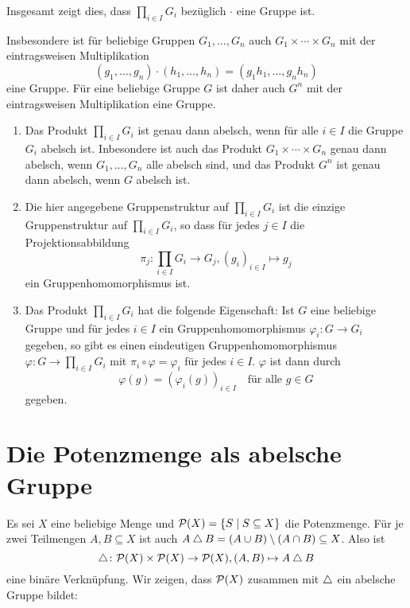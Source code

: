 Insgesamt zeigt dies, dass $\prod_{i \in I} G_i$ bezüglich $\cdot$ eine Gruppe ist.

Insbesondere ist für beliebige Gruppen $G_1, \dotsc, G_n$ auch $G_1 \times \dotsb \times G_n$ mit der eintragsweisen Multiplikation
\[
 (g_1, \dotsc, g_n) \cdot (h_1, \dotsc, h_n) = (g_1 h_1, \dotsc, g_n h_n)
\]
eine Gruppe. Für eine beliebige Gruppe $G$ ist daher auch $G^n$ mit der eintragsweisen Multiplikation eine Gruppe.


\begin{bem}
 \begin{enumerate}[leftmargin=*]
  \item
   Das Produkt $\prod_{i \in I} G_i$ ist genau dann abelsch, wenn für alle $i \in I$ die Gruppe $G_i$ abelsch ist. Inbesondere ist auch das Produkt $G_1 \times \dotsb \times G_n$ genau dann abelsch, wenn $G_1, \dotsc, G_n$ alle abelsch sind, und das Produkt $G^n$ ist genau dann abelsch, wenn $G$ abelsch ist.
  \item
   Die hier angegebene Gruppenstruktur auf $\prod_{i \in I} G_i$ ist die einzige Gruppenstruktur auf $\prod_{i \in I} G_i$, so dass für jedes $j \in I$ die Projektionsabbildung
   \[
    \pi_j \colon \prod_{i \in I} G_i \to G_j, (g_i)_{i \in I} \mapsto g_j
   \]
   ein Gruppenhomomorphismus ist.
  \item
   Das Produkt $\prod_{i \in I} G_i$ hat die folgende Eigenschaft: Ist $G$ eine beliebige Gruppe und für jedes $i \in I$ ein Gruppenhomomorphismus $\varphi_i \colon G \to G_i$ gegeben, so gibt es einen eindeutigen Gruppenhomomorphismus $\varphi \colon G \to \prod_{i \in I} G_i$ mit $\pi_i \circ \varphi = \varphi_i$ für jedes $i \in I$. $\varphi$ ist dann durch
   \[
    \varphi(g) = (\varphi_i(g))_{i \in I}
    \quad
    \text{für alle $g \in G$}
   \]
   gegeben.
 \end{enumerate}
\end{bem}





\section{Die Potenzmenge als abelsche Gruppe}
Es sei $X$ eine beliebige Menge und $\mathcal{P}(X) = \{S \mid S \subseteq X\}$ die Potenzmenge. Für je zwei Teilmengen $A, B \subseteq X$ ist auch $A \bigtriangleup B = (A \cup B) \setminus (A \cap B) \subseteq X$. Also ist
\[
 \bigtriangleup \colon \mathcal{P}(X) \times \mathcal{P}(X) \to \mathcal{P}(X),
 (A,B) \mapsto A \bigtriangleup B
\]
eine binäre Verknüpfung. Wir zeigen, dass $\mathcal{P}(X)$ zusammen mit $\bigtriangleup$ ein abelsche Gruppe bildet:

